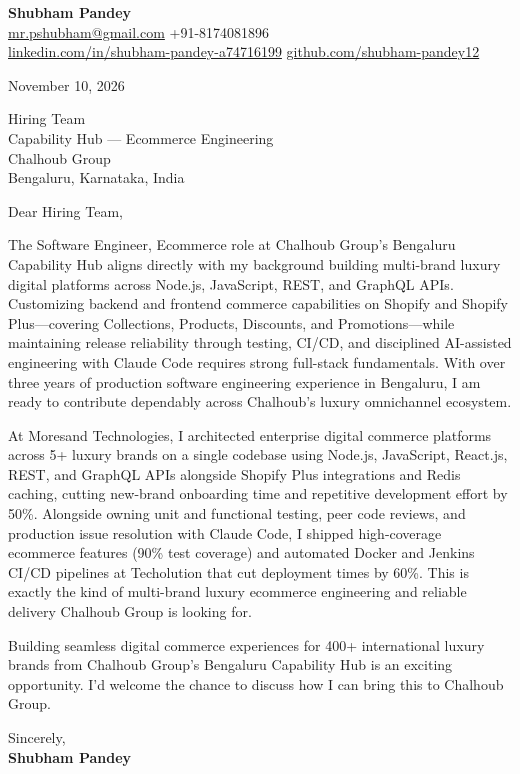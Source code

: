 \documentclass[a4paper,11pt]{article}
\begin{document}
\textbf{\Large Shubham Pandey}\\
\href{mailto:mr.pshubham@gmail.com}{mr.pshubham@gmail.com} \quad +91-8174081896\\
\href{https://www.linkedin.com/in/shubham-pandey-a74716199/}{linkedin.com/in/shubham-pandey-a74716199} \quad
\href{https://github.com/shubham-pandey12}{github.com/shubham-pandey12}

\vspace{1em}
November 10, 2026

\vspace{1em}
Hiring Team\\
Capability Hub --- Ecommerce Engineering\\
Chalhoub Group\\
Bengaluru, Karnataka, India

\vspace{1em}
Dear Hiring Team,

The Software Engineer, Ecommerce role at Chalhoub Group's Bengaluru Capability Hub aligns directly with my background building multi-brand luxury digital platforms across Node.js, JavaScript, REST, and GraphQL APIs. Customizing backend and frontend commerce capabilities on Shopify and Shopify Plus---covering Collections, Products, Discounts, and Promotions---while maintaining release reliability through testing, CI/CD, and disciplined AI-assisted engineering with Claude Code requires strong full-stack fundamentals. With over three years of production software engineering experience in Bengaluru, I am ready to contribute dependably across Chalhoub's luxury omnichannel ecosystem.

At Moresand Technologies, I architected enterprise digital commerce platforms across 5+ luxury brands on a single codebase using Node.js, JavaScript, React.js, REST, and GraphQL APIs alongside Shopify Plus integrations and Redis caching, cutting new-brand onboarding time and repetitive development effort by 50\%. Alongside owning unit and functional testing, peer code reviews, and production issue resolution with Claude Code, I shipped high-coverage ecommerce features (90\% test coverage) and automated Docker and Jenkins CI/CD pipelines at Techolution that cut deployment times by 60\%. This is exactly the kind of multi-brand luxury ecommerce engineering and reliable delivery Chalhoub Group is looking for.

Building seamless digital commerce experiences for 400+ international luxury brands from Chalhoub Group's Bengaluru Capability Hub is an exciting opportunity. I'd welcome the chance to discuss how I can bring this to Chalhoub Group.

\vspace{1em}
Sincerely,\\[0.5em]
\textbf{Shubham Pandey}
\end{document}

